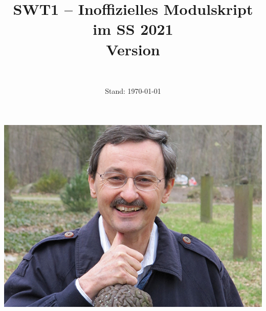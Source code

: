 \documentclass{article}
\title{SWT1 – Inoffizielles Modulskript im SS 2021\\[\subtitlelinesep]%
    \smaller[\subtitlerelsize]{}Version \version}
\author{\ushort\\\myName}
\date{Stand: \today}
\begin{document}
\maketitle
\includegraphics[width=\textwidth]{./data/tichy}
\newpage

\tableofcontents
\newpage

% 

\newpage


\newpage


\newpage


\newpage


\newpage



\newpage


\newpage


\newpage


\newpage


\newpage


\newpage


\newpage


\newpage


\newpage


\newpage


\newpage

\printindex
\newpage
\listoffigures
\end{document}
